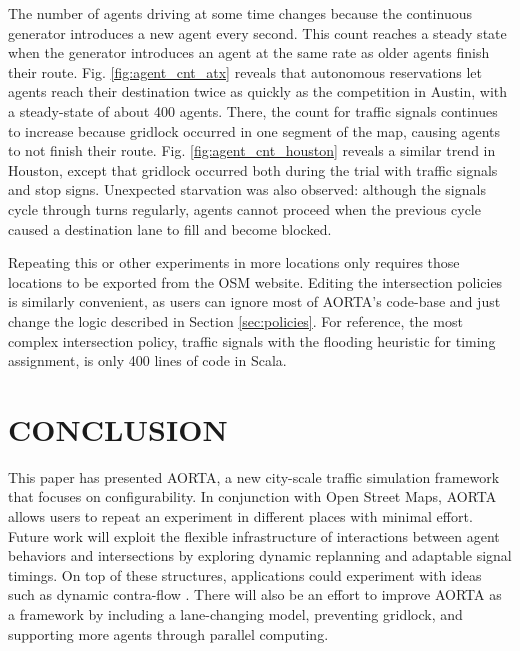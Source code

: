\documentclass[letterpaper, 10 pt, conference]{ieeeconf}  %
\begin{document}
The number of agents driving at some time changes because the continuous
generator introduces a new agent every second. This count reaches a steady state
when the generator introduces an agent at the same rate as older agents finish
their route. Fig. \ref{fig:agent_cnt_atx} reveals that autonomous reservations
let agents reach their destination twice as quickly as the competition in
Austin, with a steady-state of about 400 agents. There, the count for traffic
signals continues to increase because gridlock occurred in one segment of the
map, causing agents to not finish their route. Fig.
\ref{fig:agent_cnt_houston} reveals a similar trend in Houston, except that
gridlock occurred both during the trial with traffic signals and stop signs.
Unexpected starvation was also observed: although the signals cycle through
turns regularly, agents cannot proceed when the previous cycle caused a
destination lane to fill and become blocked.

Repeating this or other experiments in more locations only requires those
locations to be exported from the OSM website. Editing the intersection policies
is similarly convenient, as users can ignore most of AORTA's code-base and just
change the logic described in Section \ref{sec:policies}.  For reference, the
most complex intersection policy, traffic signals with the flooding heuristic
for timing assignment, is only 400 lines of code in Scala.


\section{CONCLUSION}
\label{sec:conclusion}

This paper has presented AORTA, a new city-scale traffic simulation framework
that focuses on configurability. In conjunction with Open Street Maps, AORTA
allows users to repeat an experiment in different places with minimal effort.
Future work will exploit the flexible infrastructure of interactions between
agent behaviors and intersections by exploring dynamic replanning and adaptable
signal timings. On top of these structures, applications could experiment with
ideas such as dynamic contra-flow \cite{ITSC11-hausknecht}. There will also be
an effort to improve AORTA as a framework by including a lane-changing model,
preventing gridlock, and supporting more agents through parallel computing.

\end{document}
